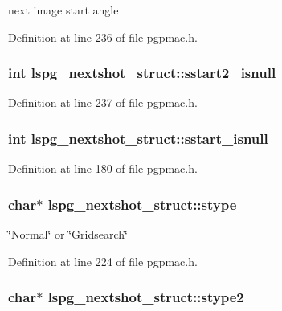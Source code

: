 next image start angle 

Definition at line 236 of file pgpmac.h.\hypertarget{structlspg__nextshot__struct_a240c8532d5ce48dbc872d5123a4e721c}{
\subsubsection[{sstart2\_\-isnull}]{\setlength{\rightskip}{0pt plus 5cm}int {\bf lspg\_\-nextshot\_\-struct::sstart2\_\-isnull}}}
\label{structlspg__nextshot__struct_a240c8532d5ce48dbc872d5123a4e721c}


Definition at line 237 of file pgpmac.h.\hypertarget{structlspg__nextshot__struct_aa53094de91e2f69d7174ab119df1cdac}{
\subsubsection[{sstart\_\-isnull}]{\setlength{\rightskip}{0pt plus 5cm}int {\bf lspg\_\-nextshot\_\-struct::sstart\_\-isnull}}}
\label{structlspg__nextshot__struct_aa53094de91e2f69d7174ab119df1cdac}


Definition at line 180 of file pgpmac.h.\hypertarget{structlspg__nextshot__struct_ab5a70b189c2fe516ca0c84bd06f3e564}{
\subsubsection[{stype}]{\setlength{\rightskip}{0pt plus 5cm}char$\ast$ {\bf lspg\_\-nextshot\_\-struct::stype}}}
\label{structlspg__nextshot__struct_ab5a70b189c2fe516ca0c84bd06f3e564}


\char`\"{}Normal\char`\"{} or \char`\"{}Gridsearch\char`\"{} 

Definition at line 224 of file pgpmac.h.\hypertarget{structlspg__nextshot__struct_ae08ef74ea76e6e099a3ff6c7f845d337}{
\subsubsection[{stype2}]{\setlength{\rightskip}{0pt plus 5cm}char$\ast$ {\bf lspg\_\-nextshot\_\-struct::stype2}}}
\label{structlspg__nextshot__struct_ae08ef74ea76e6e099a3ff6c7f845d337}


